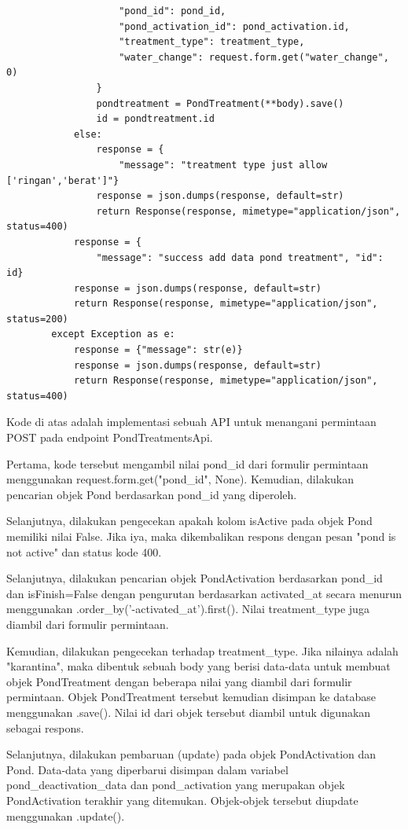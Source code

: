 \begin{enumerate}[1.]
\begin{lstlisting}
                    "pond_id": pond_id,
                    "pond_activation_id": pond_activation.id,
                    "treatment_type": treatment_type,
                    "water_change": request.form.get("water_change", 0)
                }
                pondtreatment = PondTreatment(**body).save()
                id = pondtreatment.id
            else:
                response = {
                    "message": "treatment type just allow ['ringan','berat']"}
                response = json.dumps(response, default=str)
                return Response(response, mimetype="application/json", status=400)
            response = {
                "message": "success add data pond treatment", "id": id}
            response = json.dumps(response, default=str)
            return Response(response, mimetype="application/json", status=200)
        except Exception as e:
            response = {"message": str(e)}
            response = json.dumps(response, default=str)
            return Response(response, mimetype="application/json", status=400)
\end{lstlisting}

Kode di atas adalah implementasi sebuah API untuk menangani permintaan POST pada endpoint PondTreatmentsApi.

Pertama, kode tersebut mengambil nilai pond\_id dari formulir permintaan menggunakan request.form.get("pond\_id", None). Kemudian, dilakukan pencarian objek Pond berdasarkan pond\_id yang diperoleh.

Selanjutnya, dilakukan pengecekan apakah kolom isActive pada objek Pond memiliki nilai False. Jika iya, maka dikembalikan respons dengan pesan "pond is not active" dan status kode 400.

Selanjutnya, dilakukan pencarian objek PondActivation berdasarkan pond\_id dan isFinish=False dengan pengurutan berdasarkan activated\_at secara menurun menggunakan .order\_by('-activated\_at').first(). Nilai treatment\_type juga diambil dari formulir permintaan.

Kemudian, dilakukan pengecekan terhadap treatment\_type. Jika nilainya adalah "karantina", maka dibentuk sebuah body yang berisi data-data untuk membuat objek PondTreatment dengan beberapa nilai yang diambil dari formulir permintaan. Objek PondTreatment tersebut kemudian disimpan ke database menggunakan .save(). Nilai id dari objek tersebut diambil untuk digunakan sebagai respons.

Selanjutnya, dilakukan pembaruan (update) pada objek PondActivation dan Pond. Data-data yang diperbarui disimpan dalam variabel pond\_deactivation\_data dan pond\_activation yang merupakan objek PondActivation terakhir yang ditemukan. Objek-objek tersebut diupdate menggunakan .update().


\end{enumerate}
